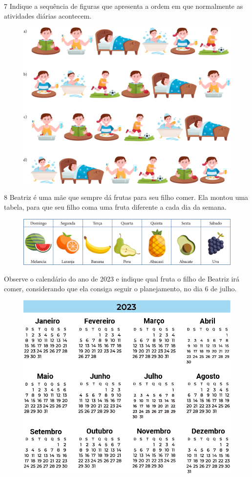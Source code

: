 \num{7} Indique a sequência de figuras que apresenta a ordem em que normalmente as
atividades diárias acontecem.\enlargethispage{6\baselineskip}

\begin{figure}[H]
\centering
\includegraphics[width=.8\textwidth]{./media/image142.png}
\end{figure}

\pagebreak
\num{8} Beatriz é uma mãe que sempre dá frutas para seu filho comer. Ela
montou uma tabela, para que seu filho coma uma fruta diferente a cada
dia da semana.

\begin{figure}[H]
\includegraphics[width=\textwidth]{./media/image143.png}
\end{figure}

Observe o calendário do ano de 2023 e indique qual fruta o filho de
Beatriz irá comer, considerando que ela consiga seguir o planejamento, no dia 6 de julho.

\begin{figure}[H]
\includegraphics[width=\textwidth]{./media/image144.png}
\end{figure}


